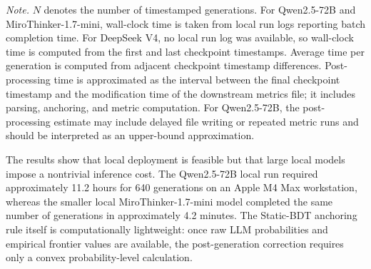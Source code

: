 \documentclass[11pt]{article}
\begin{document}
\begin{table}[htbp]
\centering
\caption{Runtime summary for full-scale unconstrained LLM generation.}
\label{tab:runtime_summary}

\vspace{0.3em}
\begin{minipage}{0.95\textwidth}
\small
\textit{Note.} \(N\) denotes the number of timestamped generations. For Qwen2.5-72B and MiroThinker-1.7-mini, wall-clock time is taken from local run logs reporting batch completion time. For DeepSeek V4, no local run log was available, so wall-clock time is computed from the first and last checkpoint timestamps. Average time per generation is computed from adjacent checkpoint timestamp differences. Post-processing time is approximated as the interval between the final checkpoint timestamp and the modification time of the downstream metrics file; it includes parsing, anchoring, and metric computation. For Qwen2.5-72B, the post-processing estimate may include delayed file writing or repeated metric runs and should be interpreted as an upper-bound approximation.
\end{minipage}
\end{table}

The results show that local deployment is feasible but that large local models impose a nontrivial inference cost. The Qwen2.5-72B local run required approximately 11.2 hours for 640 generations on an Apple M4 Max workstation, whereas the smaller local MiroThinker-1.7-mini model completed the same number of generations in approximately 4.2 minutes. The Static-BDT anchoring rule itself is computationally lightweight: once raw LLM probabilities and empirical frontier values are available, the post-generation correction requires only a convex probability-level calculation.
\end{document}
